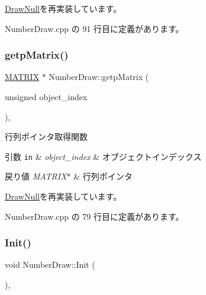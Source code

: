 \mbox{\hyperlink{class_draw_null_a0c1efe55fea325ad277594be6fe1e938}{Draw\+Null}}を再実装しています。



 Number\+Draw.\+cpp の 91 行目に定義があります。

\mbox{\label{class_number_draw_a2ea44b362c3a018faf46905d0f755410}} 
\subsubsection{\texorpdfstring{getp\+Matrix()}{getpMatrix()}}
{\footnotesize\ttfamily \mbox{\hyperlink{_vector3_d_8h_a032295cd9fb1b711757c90667278e744}{M\+A\+T\+R\+IX}} $\ast$ Number\+Draw\+::getp\+Matrix (\begin{DoxyParamCaption}\item[{unsigned}]{object\+\_\+index }\end{DoxyParamCaption})\hspace{0.3cm}{\ttfamily [override]}, {\ttfamily [virtual]}}



行列ポインタ取得関数 


\begin{DoxyParams}[1]{引数}
\mbox{\tt in}  & {\em object\+\_\+index} & オブジェクトインデックス \\
\hline
\end{DoxyParams}

\begin{DoxyRetVals}{戻り値}
{\em M\+A\+T\+R\+I\+X$\ast$} & 行列ポインタ \\
\hline
\end{DoxyRetVals}


\mbox{\hyperlink{class_draw_null_a9aac059eb3b5d1f77e8bd3aa0647cff9}{Draw\+Null}}を再実装しています。



 Number\+Draw.\+cpp の 79 行目に定義があります。

\mbox{\label{class_number_draw_ad52c1e8b9ae6e830a82c440cc18cb6c9}} 
\subsubsection{\texorpdfstring{Init()}{Init()}}
{\footnotesize\ttfamily void Number\+Draw\+::\+Init (\begin{DoxyParamCaption}{ }\end{DoxyParamCaption})\hspace{0.3cm}{\ttfamily [override]}, {\ttfamily [virtual]}}



